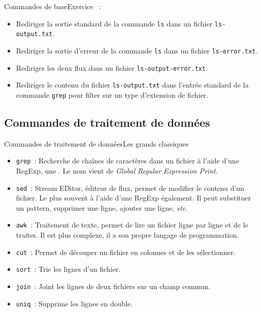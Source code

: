 \documentclass{beamer}
\begin{document}
    \begin{frame}{Commandes de base}{Exercice \execcounterdispinc{}~:}
        \begin{itemize}
            \item Rediriger la sortie standard de la commande \lstinline{ls} dans un fichier \lstinline{ls-output.txt}.
            \item Rediriger la sortie d'erreur de la commande \lstinline{ls} dans un fichier \lstinline{ls-error.txt}.
            \item Rediriger les deux flux dans un fichier \lstinline{ls-output-error.txt}.
            \item Rediriger le contenu du fichier \lstinline{ls-output.txt} dans l'entrée standard de la commande \lstinline{grep} pour filter sur un type d'extension de fichier.
        \end{itemize}
    \end{frame}

    \subsection{Commandes de traitement de données}\label{subsec:commandes-donnees}

    \begin{frame}{Commandes de traitement de données}{Les grands classiques}
        \begin{itemize}
            \item \lstinline{grep}~: Recherche de chaînes de caractères dans un fichier à l'aide d'une RegExp, une .
            Le nom vient de \textit{Global Regular Expression Print}.
            \item \lstinline{sed}~: Stream EDitor, éditeur de flux, permet de modifier le contenu d'un fichier.
            Le plus souvent à l'aide d'une RegExp également.
            Il peut substituer un pattern, supprimer une ligne, ajouter une ligne, \textit{etc}.
            \item \lstinline{awk}~: Traitement de texte, permet de lire un fichier ligne par ligne et de le traiter.
            Il est plus complexe, il a son propre langage de programmation.
            \item \lstinline{cut}~: Permet de découper un fichier en colonnes et de les sélectionner.
            \item \lstinline{sort}~: Trie les lignes d'un fichier.
            \item \lstinline{join}~: Joint les lignes de deux fichiers sur un champ commun.
            \item \lstinline{uniq}~: Supprime les lignes en double.
        \end{itemize}
    \end{frame}
\end{document}
